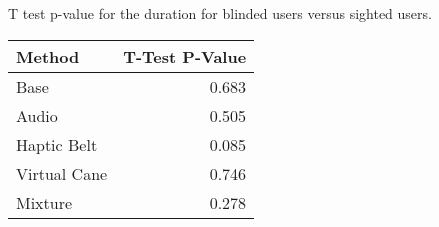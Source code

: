 
\centering
\caption{T test p-value for the duration for blinded users versus sighted users.}
\label{tab:ttest_duration}
\begin{tabular}{lr}
\toprule
      Method &  T-Test P-Value \\
\midrule
        Base &           0.683 \\
       Audio &           0.505 \\
 Haptic Belt &           0.085 \\
Virtual Cane &           0.746 \\
     Mixture &           0.278 \\
\bottomrule
\end{tabular}
